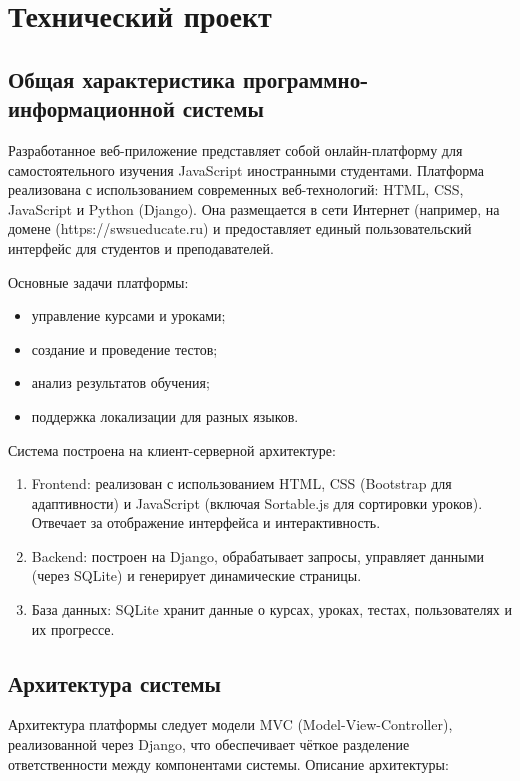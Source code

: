 \section{Технический проект}

\subsection{Общая характеристика программно-информационной системы}

Разработанное веб-приложение представляет собой онлайн-платформу для самостоятельного изучения JavaScript иностранными студентами. Платформа реализована с использованием современных веб-технологий: HTML, CSS, JavaScript и Python (Django). Она размещается в сети Интернет (например, на домене (https://swsueducate.ru) и предоставляет единый пользовательский интерфейс для студентов и преподавателей.

Основные задачи платформы:
\begin{itemize}
	\item управление курсами и уроками;
	\item создание и проведение тестов;
	\item анализ результатов обучения;
	\item поддержка локализации для разных языков.
\end{itemize}

Система построена на клиент-серверной архитектуре:
\begin{enumerate}
	\item Frontend: реализован с использованием HTML, CSS (Bootstrap для адаптивности) и JavaScript (включая Sortable.js для сортировки уроков). Отвечает за отображение интерфейса и интерактивность.
	\item Backend: построен на Django, обрабатывает запросы, управляет данными (через SQLite) и генерирует динамические страницы.
	\item {База данных}: SQLite хранит данные о курсах, уроках, тестах, пользователях и их прогрессе.
\end{enumerate}

\subsection{Архитектура системы}

Архитектура платформы следует модели MVC (Model-View-Controller), реализованной через Django, что обеспечивает чёткое разделение ответственности между компонентами системы. Описание архитектуры:

